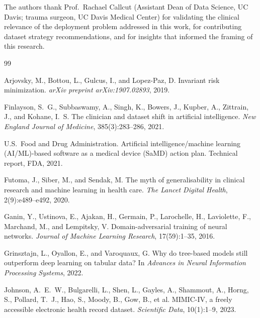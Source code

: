 \documentclass{article}
\begin{document}
\begin{ack}
The authors thank Prof.\ Rachael Callcut (Assistant Dean of Data Science, UC Davis; trauma surgeon, UC Davis Medical Center) for validating the clinical relevance of the deployment problem addressed in this work, for contributing dataset strategy recommendations, and for insights that informed the framing of this research.
\end{ack}

{\small



\begin{thebibliography}{99}

Arjovsky, M., Bottou, L., Gulcus, I., and Lopez-Paz, D.
\newblock Invariant risk minimization.
\newblock \emph{arXiv preprint arXiv:1907.02893}, 2019.

Finlayson, S.~G., Subbaswamy, A., Singh, K., Bowers, J., Kupber, A., Zittrain, J., and Kohane, I.~S.
\newblock The clinician and dataset shift in artificial intelligence.
\newblock \emph{New England Journal of Medicine}, 385(3):283--286, 2021.

U.S.\ Food and Drug Administration.
\newblock Artificial intelligence/machine learning (AI/ML)-based software as a medical device (SaMD) action plan.
\newblock Technical report, FDA, 2021.

Futoma, J., Siber, M., and Sendak, M.
\newblock The myth of generalisability in clinical research and machine learning in health care.
\newblock \emph{The Lancet Digital Health}, 2(9):e489--e492, 2020.

Ganin, Y., Ustinova, E., Ajakan, H., Germain, P., Larochelle, H., Laviolette, F., Marchand, M., and Lempitsky, V.
\newblock Domain-adversarial training of neural networks.
\newblock \emph{Journal of Machine Learning Research}, 17(59):1--35, 2016.

Grinsztajn, L., Oyallon, E., and Varoquaux, G.
\newblock Why do tree-based models still outperform deep learning on tabular data?
\newblock In \emph{Advances in Neural Information Processing Systems}, 2022.

Johnson, A.~E.~W., Bulgarelli, L., Shen, L., Gayles, A., Shammout, A., Horng, S., Pollard, T.~J., Hao, S., Moody, B., Gow, B., et al.
\newblock MIMIC-IV, a freely accessible electronic health record dataset.
\newblock \emph{Scientific Data}, 10(1):1--9, 2023.


\end{thebibliography}}
\end{document}
